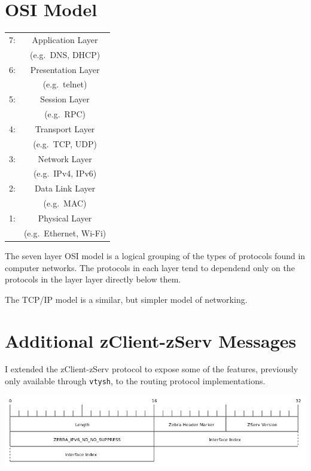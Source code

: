 \appendix 
\chapter{OSI Model}
\label{osi}
  \begin{center}
  \begin{tabular}{|lc|}
  \hline
  7: &
  Application Layer \\
  & (e.g.\ DNS, DHCP) \\
  \hline
  6: &
  Presentation Layer \\
  & (e.g.\ telnet) \\ 
  \hline
  5: &
  Session Layer \\
  & (e.g.\ RPC) \\
  \hline
  4: &
  Transport Layer \\
  & (e.g.\ TCP, UDP) \\
  \hline
  3: &
  Network Layer \\
  & (e.g.\ IPv4, IPv6) \\
  \hline  
  2: &
  Data Link Layer \\
  & (e.g.\ MAC) \\ 
  \hline  
  1: &
  Physical Layer \\
  & (e.g.\ Ethernet, Wi-Fi) \\
  \hline
\end{tabular}
\end{center}

The seven layer OSI model is a logical grouping of the types of protocols found
in computer networks. The protocols in each layer tend to dependend only on the
protocols in the layer layer directly below them. 

The TCP/IP model is a similar, but simpler model of networking.

\chapter{Additional zClient-zServ Messages}
\label{zClient}
I extended the zClient-zServ protocol to expose some of the features,
previously only available through \texttt{vtysh}, to the routing protocol
implementations. 

\begin{center}
	\includegraphics[width=0.9\linewidth]{../Diagrams/Packets/nd_no_suppress.png}
\end{center}

